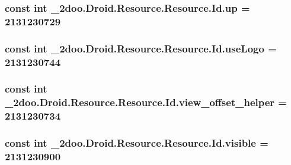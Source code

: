 \hypertarget{class__2doo_1_1_droid_1_1_resource_1_1_id_cc11caa3a16901acf2152c657d1876c7}{
\subsubsection[{up}]{\setlength{\rightskip}{0pt plus 5cm}const int \_\-2doo.Droid.Resource.Resource.Id.up = 2131230729}}
\label{class__2doo_1_1_droid_1_1_resource_1_1_id_cc11caa3a16901acf2152c657d1876c7}


\hypertarget{class__2doo_1_1_droid_1_1_resource_1_1_id_d27d3b3dc9896fc719f059541c85796d}{
\subsubsection[{useLogo}]{\setlength{\rightskip}{0pt plus 5cm}const int \_\-2doo.Droid.Resource.Resource.Id.useLogo = 2131230744}}
\label{class__2doo_1_1_droid_1_1_resource_1_1_id_d27d3b3dc9896fc719f059541c85796d}


\hypertarget{class__2doo_1_1_droid_1_1_resource_1_1_id_7a25e6a891d73b110d6d730a33ad238b}{
\subsubsection[{view\_\-offset\_\-helper}]{\setlength{\rightskip}{0pt plus 5cm}const int \_\-2doo.Droid.Resource.Resource.Id.view\_\-offset\_\-helper = 2131230734}}
\label{class__2doo_1_1_droid_1_1_resource_1_1_id_7a25e6a891d73b110d6d730a33ad238b}


\hypertarget{class__2doo_1_1_droid_1_1_resource_1_1_id_0e1668ac9417c93779a098a631fc15cc}{
\subsubsection[{visible}]{\setlength{\rightskip}{0pt plus 5cm}const int \_\-2doo.Droid.Resource.Resource.Id.visible = 2131230900}}
\label{class__2doo_1_1_droid_1_1_resource_1_1_id_0e1668ac9417c93779a098a631fc15cc}


